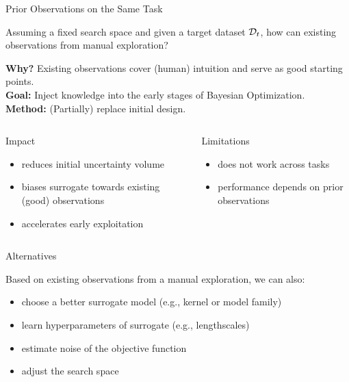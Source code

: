 \documentclass[main]{subfiles}
\begin{document}
\begin{frame}[c]{Prior Observations on the Same Task}

Assuming a fixed search space and given a target dataset $\mathcal{D}_t$, how can existing observations from manual exploration?

\vspace{0.1cm}
\textbf{Why?} Existing observations cover (human) intuition and serve as good starting points. \\
\textbf{Goal:} Inject knowledge into the early stages of Bayesian Optimization. \\
\textbf{Method:} (Partially) replace initial design. \\

\pause
{}%
%
\begin{columns}[T,onlytextwidth]
  \begin{block}{\raggedright Impact}
    \begin{itemize}
      \item reduces initial uncertainty volume
      \item biases surrogate towards existing (good) observations
      \item accelerates early exploitation
    \end{itemize}
  \end{block}
  \begin{block}{\raggedright Limitations}
    \begin{itemize}
      \item does not work across tasks
      \item performance depends on prior observations
    \end{itemize}
  \end{block}
\end{columns}

\end{frame}
\begin{frame}{Alternatives}

Based on existing observations from a manual exploration, we can also:

\begin{itemize}
    \item choose a better surrogate model (e.g., kernel or model family)
    \item learn hyperparameters of surrogate (e.g., lengthscales)
    \item estimate noise of the objective function
    \item adjust the search space
\end{itemize}

\end{frame}
\end{document}
